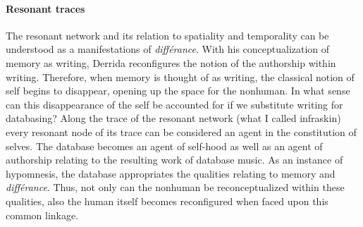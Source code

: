 \paragraph{Resonant traces}
The resonant network and its relation to spatiality and temporality can be understood as a manifestations of \textit{différance}. With his conceptualization of memory as writing, Derrida reconfigures the notion of the authorship within writing. Therefore, when memory is thought of as writing, the classical notion of self begins to disappear, opening up the space for the nonhuman. In what sense can this disappearance of the self be accounted for if we substitute writing for databasing? Along the trace of the resonant network (what I called infraskin) every resonant node of its trace can be considered an agent in the constitution of selves. The database becomes an agent of self-hood as well as an agent of authorship relating to the resulting work of database music. As an instance of hypomnesis, the database appropriates the qualities relating to memory and \textit{différance}. Thus, not only can the nonhuman be reconceptualized within these qualities, also the human itself becomes reconfigured when faced upon this common linkage. 


